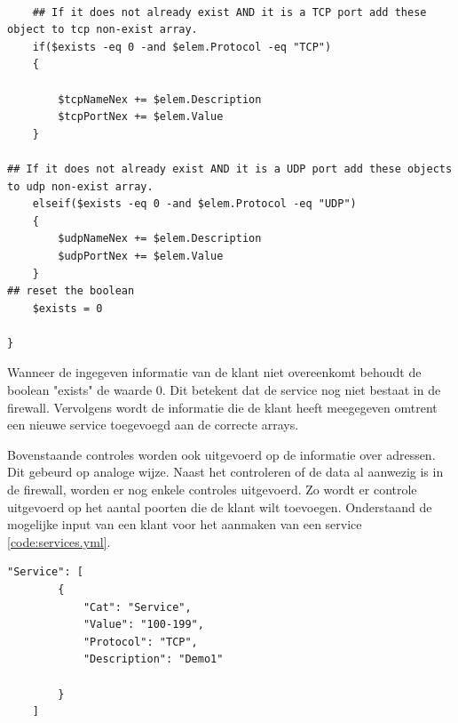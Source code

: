 \begin{lstlisting}[caption={main.ps1, controle of service bestaat deel2}]

    ## If it does not already exist AND it is a TCP port add these object to tcp non-exist array.
    if($exists -eq 0 -and $elem.Protocol -eq "TCP")
    {
      
        $tcpNameNex += $elem.Description
        $tcpPortNex += $elem.Value
    }

## If it does not already exist AND it is a UDP port add these objects to udp non-exist array.
    elseif($exists -eq 0 -and $elem.Protocol -eq "UDP")
    {
        $udpNameNex += $elem.Description
        $udpPortNex += $elem.Value
    }
## reset the boolean
    $exists = 0

}

\end{lstlisting}
Wanneer de ingegeven informatie van de klant niet overeenkomt behoudt de boolean "exists" de waarde 0. Dit betekent dat de service nog niet bestaat in de firewall. Vervolgens wordt de informatie die de klant heeft meegegeven omtrent een nieuwe service toegevoegd aan de correcte arrays. 

Bovenstaande controles worden ook uitgevoerd op de informatie over adressen. Dit gebeurd op analoge wijze. 
\newline
Naast het controleren of de data al aanwezig is in de firewall, worden er nog enkele controles uitgevoerd. Zo wordt er controle uitgevoerd op het aantal poorten die de klant wilt toevoegen. Onderstaand de mogelijke input van een klant voor het aanmaken van een service \ref{code:services.yml}.
\begin{lstlisting}[caption={main.json, Voorbeeld input klant voor service}]
    "Service": [
        {
            "Cat": "Service",
            "Value": "100-199",
            "Protocol": "TCP",
            "Description": "Demo1"

        } 
    ]
\end{lstlisting}

